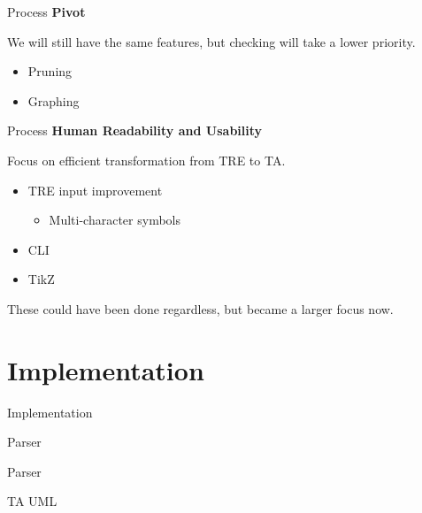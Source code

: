 \documentclass{beamer}
\begin{document}
\begin{frame}{Process}
    \textbf{Pivot}

    We will still have the same features, but checking will take a lower priority.
    \newline
    \begin{itemize}
        \item Pruning
        \item Graphing
    \end{itemize}
\end{frame}

\begin{frame}{Process}
    \textbf{Human Readability and Usability}

    Focus on efficient transformation from TRE to TA.
    \newline
    \begin{itemize}
        \item TRE input improvement
        \begin{itemize}
            \item Multi-character symbols
        \end{itemize}
        \item CLI
        \item TikZ
    \end{itemize}

    These could have been done regardless, but became a larger focus now.
\end{frame}

\section{Implementation}

\begin{frame}{Implementation}
\end{frame}

\begin{frame}[shrink=20]{Parser}
    
\end{frame}

\begin{frame}{Parser}
    
\end{frame}

\begin{frame}{TA UML}
    
\end{frame}



\end{document}
